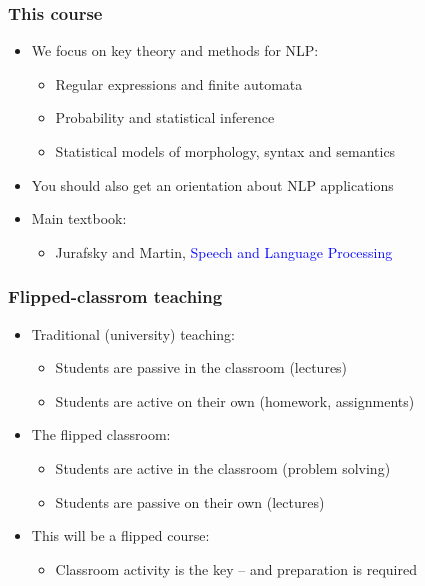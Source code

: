 \documentclass[dvipsnames]{beamer}
\begin{document}
\begin{frame}
\frametitle{This course}

\begin{itemize}
\item We focus on key theory and methods for NLP:
\begin{itemize}
\item Regular expressions and finite automata
\item Probability and statistical inference
\item Statistical models of morphology, syntax and semantics
\end{itemize}
\item You should also get an orientation about NLP applications
\item Main textbook: 
\begin{itemize}
\item Jurafsky and Martin, \textcolor{blue}{Speech and Language Processing}
\end{itemize}
\end{itemize}
\end{frame}

\begin{frame}
\frametitle{Flipped-classrom teaching}
\begin{itemize}
\item Traditional (university) teaching:
\begin{itemize}
\item Students are \alert{passive} in the classroom (lectures)
\item Students are \alert{active} on their own (homework, assignments)
\end{itemize}
\item The flipped classroom:
\begin{itemize}
\item Students are \alert{active} in the classroom (problem solving)
\item Students are \alert{passive} on their own (lectures) %
\end{itemize}
\item This will be a flipped course:
\begin{itemize}
\item Classroom activity is the key -- and preparation is required
\end{itemize}
\end{itemize}
\end{frame}
\end{document}
